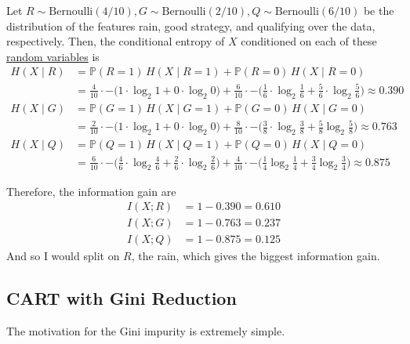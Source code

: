\begin{example}
    Let $R \sim \mathrm{Bernoulli}(4/10), G \sim \mathrm{Bernoulli}(2/10), Q \sim \mathrm{Bernoulli}(6/10)$ be the distribution of the features rain, good strategy, and qualifying over the data, respectively. Then, the conditional entropy of $X$ conditioned on each of these \hyperref[prob-def:random-variable]{random variables} is 
    \begin{align*}
      H(X \mid R) & = \mathbb{P}(R = 1)\, H(X \mid R = 1) + \mathbb{P}(R = 0) \, H(X \mid R = 0) \\
      & = \frac{4}{10} \cdot - \big( 1 \cdot \log_2 1 + 0 \cdot \log_2 0 \big) + \frac{6}{10} \cdot - \big( \frac{1}{6} \cdot \log_2 \frac{1}{6} + \frac{5}{6} \cdot \log_2 \frac{5}{6} \big) \approx 0.390 \\
      H(X \mid G) & =  \mathbb{P}(G = 1)\, H(X \mid G = 1) + \mathbb{P}(G = 0) \, H(X \mid G = 0) \\
      & = \frac{2}{10} \cdot - \big( 1 \cdot \log_2 1 + 0 \cdot \log_2 0 \big) + \frac{8}{10} \cdot - \big( \frac{3}{8} \cdot \log_2 \frac{3}{8} + \frac{5}{8} \log_2 \frac{5}{8} \big) \approx 0.763\\
      H(X \mid Q ) & = \mathbb{P}(Q = 1)\, H(X \mid Q = 1) + \mathbb{P}(Q = 0) \, H(X \mid Q = 0) \\
      & = \frac{6}{10} \cdot - \big( \frac{4}{6} \cdot \log_2 \frac{4}{6} + \frac{2}{6} \cdot \log_2 \frac{2}{6} \big) + \frac{4}{10} \cdot - \big( \frac{1}{4} \log_2 \frac{1}{4} + \frac{3}{4} \log_2 \frac{3}{4} \big) \approx 0.875
    \end{align*}

    Therefore, the information gain are 
    \begin{align*}
        I(X; R) & = 1 - 0.390 = 0.610 \\
        I(X; G) & = 1 - 0.763 = 0.237 \\
        I(X; Q) & = 1 - 0.875 = 0.125 
    \end{align*}
    And so I would split on $R$, the rain, which gives the biggest information gain. 
  \end{example}

\subsection{CART with Gini Reduction} 

  The motivation for the Gini impurity is extremely simple. 

